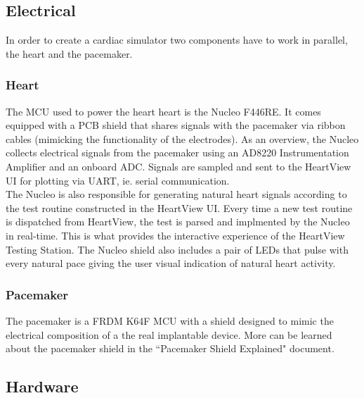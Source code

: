 \documentclass[11pt,fleqn]{book} %
\begin{document}
\subsection{Electrical}

In order to create a cardiac simulator two components have to work in parallel, the heart and the pacemaker. 


\subsubsection{Heart}

The \ac{MCU} used to power the heart heart is the Nucleo F446RE. It comes equipped with a \ac{PCB} shield that shares signals with the pacemaker via ribbon cables (mimicking the functionality of the electrodes). As an overview, the Nucleo collects electrical signals from the pacemaker using an AD8220 Instrumentation Amplifier and an onboard \ac{ADC}. Signals are sampled and sent to the HeartView UI for plotting via \ac{UART}, ie. serial communication.\\ 

The Nucleo is also responsible for generating natural heart signals according to the test routine constructed in the HeartView UI. Every time a new test routine is dispatched from HeartView, the test is parsed and implmented by the Nucleo in real-time. This is what provides the interactive experience of the HeartView Testing Station. The Nucleo shield also includes a pair of LEDs that pulse with every natural pace giving the user visual indication of natural heart activity.

\subsubsection{Pacemaker}

The pacemaker is a FRDM K64F \ac{MCU} with a shield designed to mimic the electrical composition of a the real implantable device. More can be learned about the pacemaker shield in the ``Pacemaker Shield Explained" document.


\subsection{Hardware}
\end{document}
